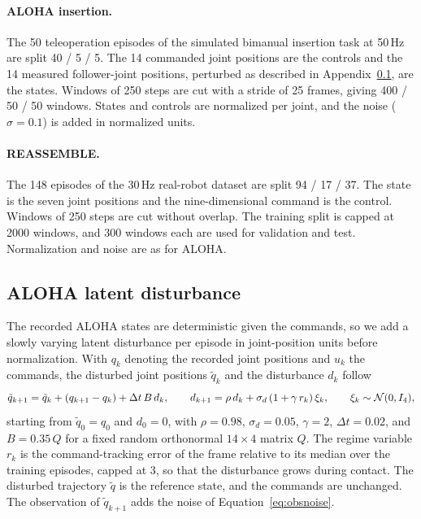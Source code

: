 \paragraph{ALOHA insertion.}
The 50 teleoperation episodes of the simulated bimanual insertion task \citep{zhao2023aloha} at 50\,Hz are split 40 / 5 / 5. The 14 commanded joint positions are the controls and the 14 measured follower-joint positions, perturbed as described in Appendix~\ref{app:aloha-disturbance}, are the states. Windows of 250 steps are cut with a stride of 25 frames, giving 400 / 50 / 50 windows. States and controls are normalized per joint, and the noise ($\sigma=0.1$) is added in normalized units.

\paragraph{REASSEMBLE.}
The 148 episodes of the 30\,Hz real-robot dataset \citep{sliwowski2025reassemble} are split 94 / 17 / 37. The state is the seven joint positions and the nine-dimensional command is the control. Windows of 250 steps are cut without overlap. The training split is capped at 2000 windows, and 300 windows each are used for validation and test. Normalization and noise are as for ALOHA.

\subsection{ALOHA latent disturbance}\label{app:aloha-disturbance}
The recorded ALOHA states are deterministic given the commands, so we add a slowly varying latent disturbance per episode in joint-position units before normalization. With $q_k$ denoting the recorded joint positions and $u_k$ the commands, the disturbed joint positions $\tilde q_k$ and the disturbance $d_k$ follow
\begin{equation}\label{eq:alohadisturbance}
 \tilde q_{k+1}=\tilde q_k+(q_{k+1}-q_k)+\Delta t\,B\,d_k,\qquad
 d_{k+1}=\rho\,d_k+\sigma_d\,(1+\gamma\,r_k)\,\xi_k,\qquad \xi_k\sim\mathcal N(0,I_4),
\end{equation}
starting from $\tilde q_0=q_0$ and $d_0=0$, with $\rho=0.98$, $\sigma_d=0.05$, $\gamma=2$, $\Delta t=0.02$, and $B=0.35\,Q$ for a fixed random orthonormal $14\times4$ matrix $Q$. The regime variable $r_k$ is the command-tracking error of the frame relative to its median over the training episodes, capped at 3, so that the disturbance grows during contact. The disturbed trajectory $\tilde q$ is the reference state, and the commands are unchanged. The observation of $\tilde q_{k+1}$ adds the noise of Equation~\eqref{eq:obsnoise}.

